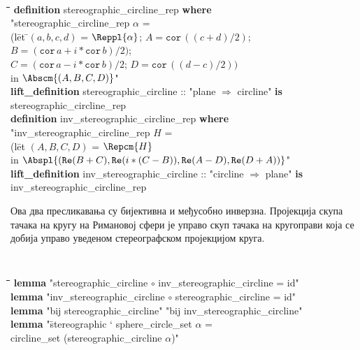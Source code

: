 {\tt
\begin{tabbing}
\hspace{5mm}\=\hspace{5mm}\=\hspace{5mm}\=\hspace{5mm}\=\hspace{5mm}\=\kill
{\bf definition} stereographic\_circline\_rep {\bf where} \\
\>"stereographic\_circline\_rep $\alpha$  =\\
\>\>(l\=et \=$(a, b, c, d)$ = $\Reppl{\alpha}$; $A=\mathtt{cor}\,((c+d)/2)$; $B=(\mathtt{cor}\,a + i* \mathtt{cor}\,b)/2)$;\\
\>\>\>\>$C=(\mathtt{cor}\,a - i*\mathtt{cor}\,b)/2$; $D=\mathtt{cor}\,((d-c)/2))$\\
\>\>\>in $\Abscm{(A, B, C, D)}$"\\
{\bf lift\_definition} stereographic\_circline :: "plane $\Rightarrow$ circline" {\bf is}\\
\>stereographic\_circline\_rep\\
{\bf definition} inv\_stereographic\_circline\_rep {\bf where} \\
\>"inv\_stereographic\_circline\_rep $H$  =\\
\>\>(l\=et $(A, B, C, D)$ = $\Repcm{H}$\\
\>\>\>in $\Abspl{(\mathtt{Re}(B+C), \mathtt{Re}(i*(C-B)), \mathtt{Re}(A-D), \mathtt{Re}(D+A))}$"\\
{\bf lift\_definition} inv\_stereographic\_circline :: "circline $\Rightarrow$ plane" {\bf is}\\
\>inv\_stereographic\_circline\_rep
\end{tabbing}
}

Ова два пресликавања су бијективна и међусобно инверзна. Пројекција
скупа тачака на кругу на Римановој сфери је управо скуп тачака на
кругоправи која се добија управо уведеном стереографском пројекцијом
круга.  {\tt
\begin{tabbing}
\hspace{5mm}\=\hspace{5mm}\=\hspace{5mm}\=\hspace{5mm}\=\hspace{5mm}\=\kill
{\bf lemma} "stereographic\_circline $\circ$ inv\_stereographic\_circline = id"\\
{\bf lemma} "inv\_stereographic\_circline $\circ$ stereographic\_circline = id"\\
{\bf lemma} "bij stereographic\_circline" "bij inv\_stereographic\_circline"\\
{\bf lemma} "\=stereographic ` sphere\_circle\_set $\alpha$ = \\
\>circline\_set (stereographic\_circline $\alpha$)"
\end{tabbing}
}


